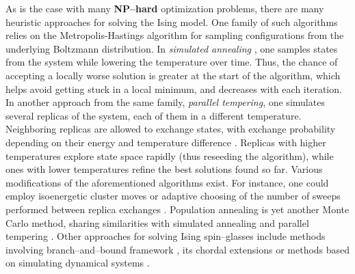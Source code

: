 As is the case with many \textbf{NP--hard} optimization problems, there are
many heuristic approaches for solving the Ising model. One family of such
algorithms relies on the Metropolis-Hastings \cite{beichl} algorithm for
sampling configurations from the underlying Boltzmann distribution. In
\emph{simulated annealing} \cite{cook, isakov}, one samples states from the
system while lowering the temperature over time. Thus, the chance of accepting
a locally worse solution is greater at the start of the algorithm, which helps
avoid getting stuck in a local minimum, and decreases with each iteration. In
another approach from the same family, \emph{parallel tempering}, one simulates
several replicas of the system, each of them in a different temperature.
Neighboring replicas are allowed to exchange states, with exchange probability
depending on their energy and temperature difference \cite{swendsen}. Replicas
with higher temperatures explore state space rapidly (thus reseeding the
algorithm), while ones with lower temperatures refine the best solutions found
so far. Various modifications of the aforementioned algorithms exist. For
instance, one could employ isoenergetic cluster moves \cite{zhu} or adaptive
choosing of the number of sweeps performed between replica exchanges
\cite{bittner}. Population annealing is yet another Monte Carlo method, sharing
similarities with simulated annealing and parallel tempering \cite{wang}. Other
approaches for solving Ising spin--glasses include methods involving
branch--and--bound framework \cite{rendl}, its chordal extensions
\cite{baccari} or methods based on simulating dynamical systems \cite{sheldon}.

